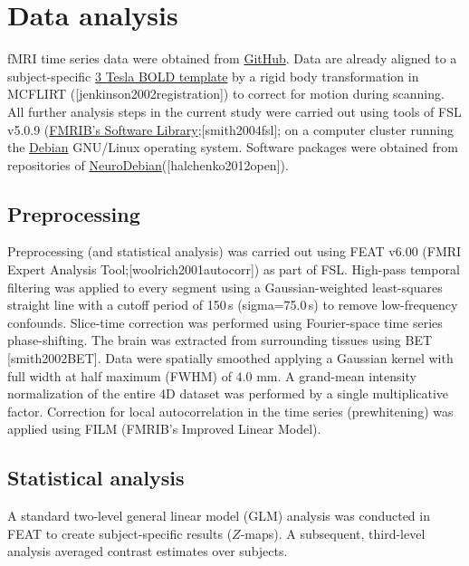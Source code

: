 \documentclass[english]{article}
\begin{document}
\section{Data analysis }
fMRI time series data were obtained from
\href{''https://github.com/psychoinformatics-de/studyforrest-data-aligned''}{GitHub}. Data are already aligned to a subject-specific \href{''https://github.com/psychoinformatics-de/studyforrest-data-templatetransforms''}{3 Tesla BOLD template}  by a rigid body transformation in MCFLIRT ([jenkinson2002registration]) to correct for motion during scanning. All further analysis steps in the current study were carried out using tools of FSL v5.0.9 (\href{''https://www.fmrib.ox.ac.uk/fsl''}{FMRIB's Software Library};[smith2004fsl]; on a computer cluster running the \href{https://www.debian.org}{Debian} GNU/Linux operating system. Software packages were obtained from repositories of \href{http://neuro.debian.net}{NeuroDebian}([halchenko2012open]).

\subsection{Preprocessing}
Preprocessing (and statistical analysis) was carried out using FEAT v6.00 (FMRI Expert Analysis Tool;[woolrich2001autocorr]) as part of FSL. High-pass temporal filtering was applied to every segment using a Gaussian-weighted least-squares straight line with a cutoff period of 150\,s (sigma=75.0\,s) to remove low-frequency confounds. Slice-time correction was performed using Fourier-space time series phase-shifting.  The brain was extracted from surrounding tissues using BET [smith2002BET]. Data were spatially smoothed applying a Gaussian kernel with full width at half maximum (FWHM) of 4.0 mm. A grand-mean intensity normalization of the entire 4D dataset was performed by a single multiplicative factor. Correction for local autocorrelation in the time series (prewhitening) was applied using FILM (FMRIB’s Improved Linear Model).

\subsection{Statistical analysis}
A standard two-level general linear model (GLM) analysis was conducted in FEAT to create subject-specific results ($Z$-maps). A subsequent, third-level analysis averaged contrast estimates over subjects.
\end{document}
